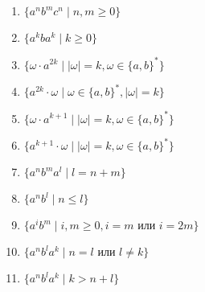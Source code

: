 \documentclass[12pt]{article}
\begin{document}
\begin{enumerate}
\begin{enumerate}[label=\arabic*)]
    \item $\{ a^n b^m c^n \mid n, m \ge 0 \}$
    \item $\{ a^k b a^k \mid k \ge 0 \}$
    \item $\{ \omega \cdot a^{2k} \mid |\omega| = k, \omega \in \{a, b\}^* \}$
    \item $\{ a^{2k} \cdot \omega \mid \omega \in \{a, b\}^*, |\omega| = k \}$
    \item $\{ \omega \cdot a^{k+1} \mid |\omega| = k, \omega \in \{a, b\}^* \}$
    \item $\{ a^{k+1} \cdot \omega \mid |\omega| = k, \omega \in \{a, b\}^* \}$
    \item $\{ a^n b^m a^l \mid l = n + m \}$
    \item $\{ a^n b^l \mid n \le l\}$
    \item $\{ a^i b^m \mid i, m \ge 0, i = m \text{ или } i = 2m \}$
    \item $\{ a^n b^l a^k \mid n = l \text{ или } l \neq k\}$
    \item $\{ a^n b^l a^k \mid k > n + l \}$
  \end{enumerate}


\end{enumerate}
\end{document}
